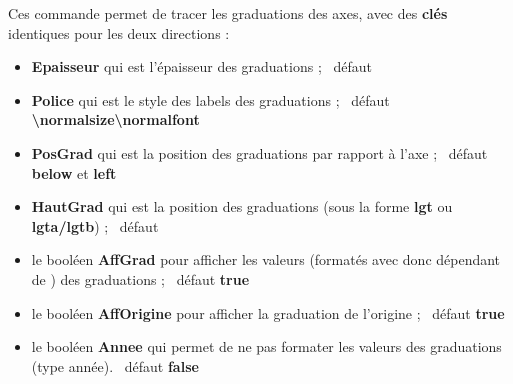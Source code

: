 \documentclass[a4paper,french,11pt]{article}
\newcommand\ctex[1]{\tcbox[vignettelatex]{#1}}
\newcommand\Cle[1]{{\bfseries\sffamily\textlangle #1\textrangle}}
\begin{document}

\begin{codetex}
\end{codetex}

\begin{codecles}
Ces commande permet de tracer les graduations des axes, avec des \Cle{clés} identiques pour les deux directions :

\begin{itemize}
	\item \Cle{Epaisseur} qui est l'épaisseur des graduations ; \hfill~défaut \Cle{1pt}
	\item \Cle{Police} qui est le style des labels des graduations ; \hfill~défaut \Cle{\textbackslash{}normalsize\textbackslash{}normalfont}
	\item \Cle{PosGrad} qui est la position des graduations par rapport à l'axe ; \hfill~défaut \Cle{below} et \Cle{left}
	\item \Cle{HautGrad} qui est la position des graduations (sous la forme \Cle{lgt} ou \Cle{lgta/lgtb}) ; \hfill~défaut \Cle{4pt}
	\item le booléen \Cle{AffGrad} pour afficher les valeurs (formatés avec \ctex{num} donc dépendant de \ctex{sisetup}) des graduations  ; \hfill~défaut \Cle{true}
	\item le booléen \Cle{AffOrigine} pour afficher la graduation de l'origine ; \hfill~défaut \Cle{true}
	\item le booléen \Cle{Annee} qui permet de ne pas formater les valeurs des graduations (type \textsf{année}). \hfill~défaut \Cle{false}
\end{itemize}
\end{codecles}

\begin{codetex}


\end{codetex}
\end{document}
